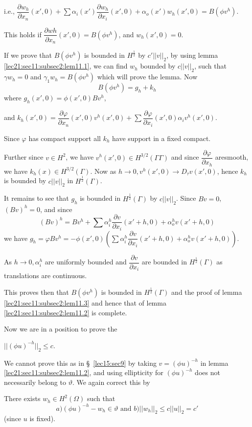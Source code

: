 i.e., $\dfrac{\partial w_h}{\partial x_n} (x', 0) + \sum \alpha_i
(x') \dfrac{\partial w_h}{\partial x_i} (x' , 0) + \alpha_o (x') w_h
(x' , 0) = B(\phi v^h)$.

This holds if $\dfrac{\partial wh}{\partial x_n} (x' , 0) = B (\phi
v^h)$, and $w_h (x' , 0) = 0$.  

If we prove that $B (\phi v^h)$ is bounded in $H^{\frac{1}{2}}$ by $c'
|| v ||_2$, by using lemma \ref{lec21:sec11:subsec2:lem11.1}, we can find $w_h$ bounded by $c ||
v ||_2$, such that $\gamma w_h = 0$ and $\gamma_1 w_h = B(\phi v^h)$
which will prove the lemma. Now 
$$
B(\phi v^h) = g_h + k_h
$$
where \quad $g_h (x' , 0) = \phi (x' , 0) B v^h$, 

and \quad $k_h (x' , 0) = \dfrac{\partial \varphi}{\partial x_n} (x' ,
0) v^h (x' , 0) + \sum \dfrac{\partial \varphi}{\partial x_i} (x' , 0)
\alpha_i v^h (x' , 0)$.  

Since $\varphi$ has compact support all $k_h$ have support in a fixed compact. 

Further since $v \in H^2$, we have $v^h (x' , 0) \in
H^{3/2} (\Gamma \Gamma )$ and since $\dfrac{\partial \varphi}{\partial
  x_h}$ are\pageoriginale smooth, we have $k_h (x) \in H^{3/2}
(\Gamma)$. Now as $h \to 0, v^h (x' , 0) \to D_\tau v(x' , 0)$, hence
$k_h$ is bounded by $c || v ||_2$ in $H^{\frac{1}{2}} (\Gamma)$.  

It remains to see that $g_h$ is bounded in $H^{\frac{1}{2}} (\Gamma)$
by $c || v ||_2$. Since $Bv = 0$, $(Bv)^h = 0$, and since 
$$
(Bv)^h = Bv^h + \sum \alpha^h_i \frac{\partial v}{\partial x_i}(x' +
h, 0) + \alpha^h_o v (x' + h, 0) 
$$
we have $g_h = \varphi Bv^h = - \phi (x' , 0) (\sum \alpha^h_i
\dfrac{\partial v}{\partial x_i} (x' + h, 0) + \alpha^h_o v(x' + h,
0))$.  

As $h \to 0, \alpha^h_i$ are uniformly bounded and $\dfrac{\partial
  v}{\partial x_i} $ are bounded in $H^{\frac{1}{2}} (\Gamma)$ as
translations are continuous.  

This proves then that $B (\phi v^h)$ is bounded in
$H^{\frac{1}{2}}(\Gamma)$ and the proof of lemma \ref{lec21:sec11:subsec2:lem11.3} and hence
that of lemma \ref{lec21:sec11:subsec2:lem11.2} is complete.  

Now we are in a position to prove the
\begin{lemma}\label{lec21:sec11:subsec2:lem11.4} %
$|| (\phi u)^{-h} ||_2 \leq c$. 
\end{lemma}

We cannot prove this as in \S\ \ref{lec15:sec9} by taking $v = (\phi u)^{-h}$ in
lemma \ref{lec21:sec11:subsec2:lem11.2}, and using ellipticity for $(\phi u)^{-h}$ does not
necessarily belong to $\vartheta$. We again correct this by 
\begin{lemma}\label{lec21:sec11:subsec2:lem11.5} %
There exists $w_h \in H^2 (\Omega)$ such that
$$
a) (\phi u)^{-h} - w_h \in \vartheta \text { and } b) || w_h
||_2 \leq c || u ||_2 = c' 
$$
(since $u$ is fixed). 
\end{lemma}

